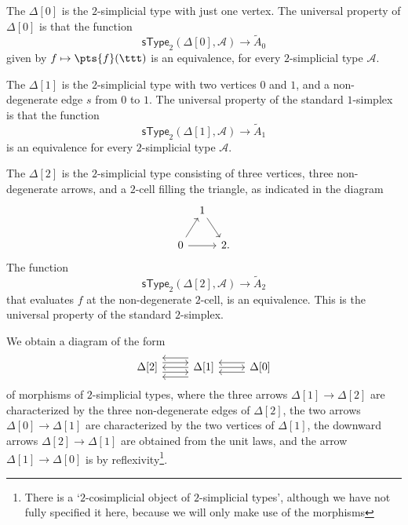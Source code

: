 \begin{eg}
The  $\Delta[0]$ is the $2$-simplicial type with just one vertex. The universal property of $\Delta[0]$ is that the function 
\begin{equation*}
\mathsf{sType}_2(\Delta[0],\mathcal{A}) \to \tilde{A}_0
\end{equation*}
given by $f\mapsto \pts{f}(\ttt)$ is an equivalence, for every $2$-simplicial type $\mathcal{A}$.

The  $\Delta[1]$ is the $2$-simplicial type with two vertices $0$ and $1$, and a non-degenerate edge $s$ from $0$ to $1$. The universal property of the standard $1$-simplex is that the function
\begin{equation*}
\mathsf{sType}_2(\Delta[1],\mathcal{A}) \to \tilde{A}_1
\end{equation*}
is an equivalence for every $2$-simplicial type $\mathcal{A}$.

The  $\Delta[2]$ is the $2$-simplicial type consisting of three vertices, three non-degenerate arrows, and a $2$-cell filling the triangle, as indicated in the diagram
\begin{equation*}
\begin{tikzcd}[column sep=tiny]
& 1 \arrow[dr] \\
0 \arrow[ur] \arrow[rr] & & 2.
\end{tikzcd}
\end{equation*}
The function
\begin{equation*}
\mathsf{sType}_2(\Delta[2],\mathcal{A}) \to \tilde{A}_2
\end{equation*}
that evaluates $f$ at the non-degenerate $2$-cell, is an equivalence. This is the universal property of the standard $2$-simplex.

We obtain a diagram of the form
\begin{equation*}
\begin{tikzcd}
\Delta[2] \arrow[r,yshift=1ex] \arrow[r,yshift=-1ex] & \Delta[1] \arrow[l,yshift=2ex] \arrow[l] \arrow[l,yshift=-2ex] \arrow[r] & \Delta[0] \arrow[l,yshift=1ex] \arrow[l,yshift=-1ex]
\end{tikzcd}
\end{equation*}
of morphisms of $2$-simplicial types, where the three arrows $\Delta[1]\to\Delta[2]$ are characterized by the three non-degenerate edges of $\Delta[2]$, the two arrows $\Delta[0]\to\Delta[1]$ are characterized by the two vertices of $\Delta[1]$, the downward arrows $\Delta[2]\to\Delta[1]$ are obtained from the unit laws, and the arrow $\Delta[1]\to \Delta[0]$ is by reflexivity\footnote{There is a `$2$-cosimplicial object of $2$-simplicial types', although we have not fully specified it here, because we will only make use of the morphisms}.
\end{eg}

